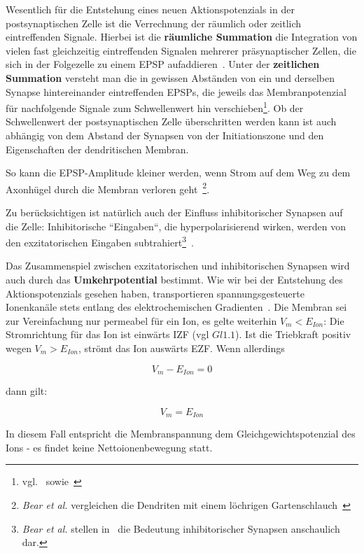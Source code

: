 {{{Wesentlich für die Entstehung eines neuen Aktionspotenzials in der postsynaptischen Zelle ist die Verrechnung der räumlich oder zeitlich eintreffenden Signale. 
Hierbei ist die \textbf{räumliche Summation} die Integration von vielen fast gleichzeitig eintreffenden Signalen mehrerer präsynaptischer Zellen, die sich in der Folgezelle zu einem EPSP aufaddieren~\cite[101]{HS19a}.
Unter der \textbf{zeitlichen Summation} versteht man die in gewissen Abständen von ein und derselben Synapse hintereinander eintreffenden EPSPs, die jeweils  das Membranpotenzial für nachfolgende Signale zum Schwellenwert hin verschieben\footnote{
 vgl.~\cite[142]{BCP18} sowie~\cite[101]{HS19a}
}.
Ob der Schwellenwert der postsynaptischen Zelle überschritten werden kann ist auch abhängig von dem Abstand der Synapsen von der Initiationszone und den Eigenschaften der dendritischen Membran.

So kann die EPSP-Amplitude kleiner werden, wenn Strom auf dem Weg zu dem Axonhügel durch die Membran verloren geht~\cite[142 f.]{BCP18}\footnote{
 \textit{Bear et al.} vergleichen die Dendriten mit einem löchrigen Gartenschlauch~\cite[143]{BCP18}
}.

Zu berücksichtigen ist natürlich auch der Einfluss inhibitorischer Synapsen auf die Zelle: Inhibitorische ``Eingaben``, die hyperpolarisierend wirken, werden von den exzitatorischen Eingaben subtrahiert\footnote{
 \textit{Bear et al.} stellen in~\cite[146, Exkurs 5.6]{BCP18} die Bedeutung inhibitorischer Synapsen anschaulich dar.
}~\cite[225]{KSJ+13}.


Das Zusammenspiel zwischen exzitatorischen und inhibitorischen Synapsen wird auch durch das \textbf{Umkehrpotential} bestimmt. 
Wie wir bei der Entstehung des Aktionspotenzials gesehen haben, transportieren spannungsgesteuerte Ionenkanäle stets entlang des elektrochemischen Gradienten~\cite[39]{Fak19}.
Die Membran sei zur Vereinfachung nur permeabel für ein Ion, es gelte weiterhin $V_m < E_{Ion}$: Die Stromrichtung für das Ion ist einwärts IZF (vgl $Gl1.1$). Ist die Triebkraft positiv wegen $V_m > E_{Ion}$, strömt das Ion auswärts EZF. Wenn allerdings

\begin{equation}
V_m - E_{Ion} = 0
\end{equation}

dann gilt:

\begin{equation}
V_m = E_{Ion}
\end{equation}

In diesem Fall entspricht die Membranspannung dem Gleichgewichtspotenzial des Ions - es findet keine Nettoionenbewegung statt.\\

}}}
